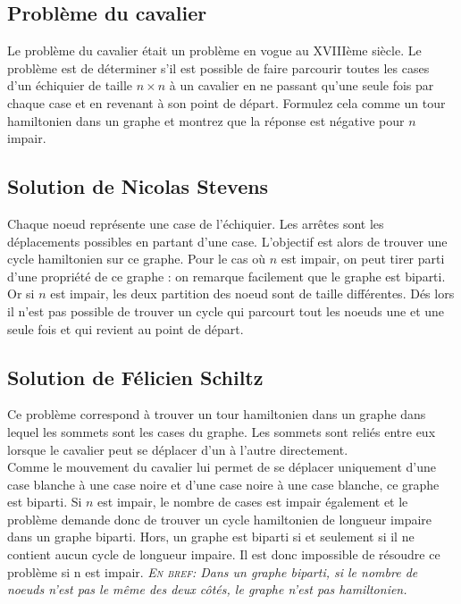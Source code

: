 \subsection{Problème du cavalier}
Le problème du cavalier était un problème en vogue au XVIIIème siècle. Le problème est de déterminer s'il est possible de faire parcourir toutes les cases d'un échiquier de taille $n \times n$ à un cavalier en ne passant qu'une seule fois par chaque case et en revenant à son point de départ. Formulez cela comme un tour hamiltonien dans un graphe et montrez que la réponse est négative pour $n$ impair.
\begin{solution}
\subsection{Solution de Nicolas Stevens}
Chaque noeud représente une case de l'échiquier. Les arrêtes sont les déplacements possibles en partant d'une case. L'objectif est alors de trouver une cycle hamiltonien sur ce graphe. Pour le cas où $n$ est impair, on peut tirer parti d'une propriété de ce graphe : on remarque facilement que le graphe est biparti. Or si $n$ est impair, les deux partition des noeud sont de taille différentes. Dés lors il n'est pas possible de trouver un cycle qui parcourt tout les noeuds une et une seule fois et qui revient au point de départ.

\subsection{Solution de Félicien Schiltz}
Ce problème correspond à trouver un tour hamiltonien dans un graphe dans lequel les sommets sont les cases du graphe. Les sommets sont reliés entre eux lorsque le cavalier peut se déplacer d'un à l'autre directement.\\
Comme le mouvement du cavalier lui permet de se déplacer uniquement d'une case blanche à une case noire et d'une case noire à une case blanche, ce graphe est biparti.
Si $n$ est impair, le nombre de cases est impair également et le problème demande donc de trouver un cycle hamiltonien de longueur impaire dans un graphe biparti. Hors, un graphe est biparti si et seulement si il ne contient aucun cycle de longueur impaire. Il est donc impossible de résoudre ce problème si n est impair.
\textit{\textsc{En bref: }Dans un graphe biparti, si le nombre de noeuds n'est pas le même des deux côtés, le graphe n'est pas hamiltonien.}
\end{solution}

